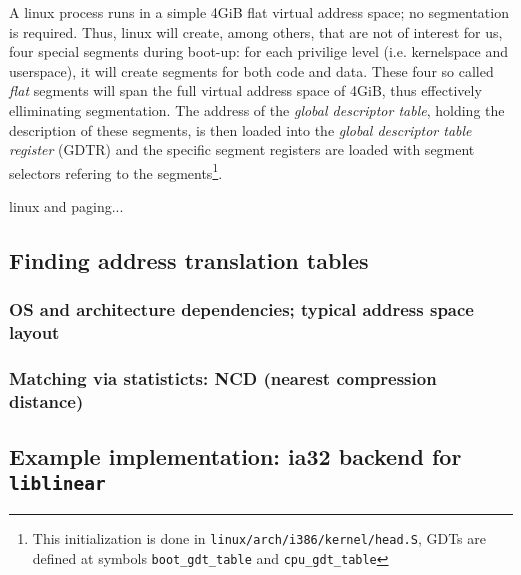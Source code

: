 A linux process runs in a simple 4GiB flat virtual address space; no
segmentation is required. Thus, linux will create, among others, that are not of
interest for us, four special segments during boot-up: for each privilige level
(i.e. kernelspace and userspace), it will create segments for both code and
data. These four so called \emph{flat} segments will span the full virtual
address space of 4GiB, thus effectively elliminating segmentation. The address
of the \emph{global descriptor table}, holding the description of these
segments, is then loaded into the \emph{global descriptor table register} (GDTR)
and the specific segment registers are loaded with segment selectors refering to
the segments\footnote{This initialization is done in
\texttt{linux/arch/i386/kernel/head.S}, GDTs are defined at symbols
\texttt{boot\_gdt\_table} and \texttt{cpu\_gdt\_table}}.

linux and paging...


\subsection{Finding address translation tables}
\label{findingATT}

\subsubsection{OS and architecture dependencies; typical address space layout}

\subsubsection{Matching via statisticts: NCD (nearest compression distance)}



\subsection{Example implementation: ia32 backend for \texttt{liblinear}}



